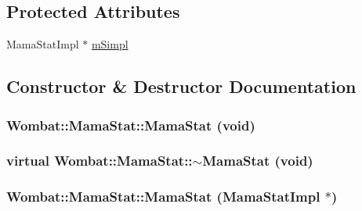 \subsection*{Protected Attributes}
\begin{DoxyCompactItemize}
\item 
MamaStatImpl $\ast$ \hyperlink{classWombat_1_1MamaStat_a0cc73961a8457a936d69462ed81994db}{mSimpl}
\end{DoxyCompactItemize}


\subsection{Constructor \& Destructor Documentation}
\hypertarget{classWombat_1_1MamaStat_ab6c402a2fce830b3912247bbfc9ca412}{
\subsubsection[{MamaStat}]{\setlength{\rightskip}{0pt plus 5cm}Wombat::MamaStat::MamaStat (void)}}
\label{classWombat_1_1MamaStat_ab6c402a2fce830b3912247bbfc9ca412}
\hypertarget{classWombat_1_1MamaStat_a31c23e8b7fdaad3881389575023463dd}{
\subsubsection[{$\sim$MamaStat}]{\setlength{\rightskip}{0pt plus 5cm}virtual Wombat::MamaStat::$\sim$MamaStat (void)}}
\label{classWombat_1_1MamaStat_a31c23e8b7fdaad3881389575023463dd}
\hypertarget{classWombat_1_1MamaStat_ab9b0ff4cfe6faf1833313530a2971979}{
\subsubsection[{MamaStat}]{\setlength{\rightskip}{0pt plus 5cm}Wombat::MamaStat::MamaStat (MamaStatImpl $\ast$)}}
\label{classWombat_1_1MamaStat_ab9b0ff4cfe6faf1833313530a2971979}


